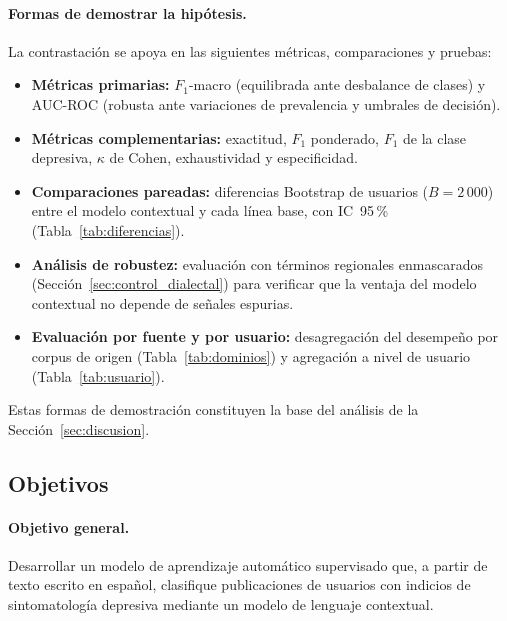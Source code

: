 \documentclass[12pt,a4paper]{article}
\begin{document}
\paragraph{Formas de demostrar la hipótesis.}
La contrastación se apoya en las siguientes métricas, comparaciones y pruebas:
\begin{itemize}[leftmargin=2em]
    \item \textbf{Métricas primarias:} $F_1$-macro (equilibrada ante desbalance de clases) y AUC-ROC (robusta ante variaciones de prevalencia y umbrales de decisión).
    \item \textbf{Métricas complementarias:} exactitud, $F_1$ ponderado, $F_1$ de la clase depresiva, $\kappa$ de Cohen, exhaustividad y especificidad.
    \item \textbf{Comparaciones pareadas:} diferencias Bootstrap de usuarios ($B=2\,000$) entre el modelo contextual y cada línea base, con IC~95\,\% (Tabla~\ref{tab:diferencias}).
    \item \textbf{Análisis de robustez:} evaluación con términos regionales enmascarados (Sección~\ref{sec:control_dialectal}) para verificar que la ventaja del modelo contextual no depende de señales espurias.
    \item \textbf{Evaluación por fuente y por usuario:} desagregación del desempeño por corpus de origen (Tabla~\ref{tab:dominios}) y agregación a nivel de usuario (Tabla~\ref{tab:usuario}).
\end{itemize}
Estas formas de demostración constituyen la base del análisis de la Sección~\ref{sec:discusion}.

\subsection{Objetivos}
\label{sec:objetivos}

\paragraph{Objetivo general.}
Desarrollar un modelo de aprendizaje automático supervisado que, a partir de texto escrito en español, clasifique publicaciones de usuarios con indicios de sintomatología depresiva mediante un modelo de lenguaje contextual.
\end{document}
